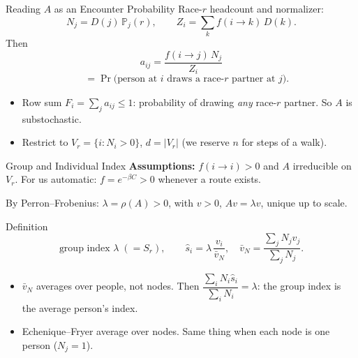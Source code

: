 \documentclass[aspectratio=169,10pt]{beamer}
\begin{document}
\begin{frame}[shrink=0]{Reading $A$ as an Encounter Probability}
Race-$r$ headcount and normalizer:
\[
N_j = D(j)\,\mathbb{P}_j(r), \qquad
Z_i = \sum_{k} f(i\to k)\,D(k).
\]
Then
\[
a_{ij} = \frac{f(i\to j)\,N_j}{Z_i}
\]
\[
\phantom{a_{ij}} = \Pr\big(\text{person at } i \text{ draws a race-}r
\text{ partner at } j\big).
\]
\begin{itemize}
    \item Row sum $F_i = \sum_j a_{ij} \le 1$: probability of drawing
    \emph{any} race-$r$ partner. So $A$ is substochastic.
    \item Restrict to $V_r = \{i : N_i > 0\}$, $d = |V_r|$
    (we reserve $n$ for steps of a walk).
\end{itemize}
\end{frame}
 
\begin{frame}[shrink=0]{Group and Individual Index}
\textbf{Assumptions:} $f(i\to i) > 0$ and $A$ irreducible on $V_r$.
For us automatic: $f = e^{-\beta C} > 0$ whenever a route exists.
 
\vspace{0.2cm}
By Perron--Frobenius: $\lambda = \rho(A) > 0$, with $v > 0$,
$Av = \lambda v$, unique up to scale.
 
\begin{block}{Definition}
\[
\text{group index } \lambda \;(= S_r), \qquad
\hat s_i = \lambda\,\frac{v_i}{\bar v_N}, \quad
\bar v_N = \frac{\sum_j N_j v_j}{\sum_j N_j}.
\]
\end{block}
\begin{itemize}
    \item $\bar v_N$ averages over \alert{people}, not nodes. Then
    $\dfrac{\sum_i N_i \hat s_i}{\sum_i N_i} = \lambda$:
    the group index is the average person's index.
    \item Echenique--Fryer average over nodes. Same thing when each
    node is one person ($N_j = 1$).
\end{itemize}
\end{frame}
 
\end{document}

